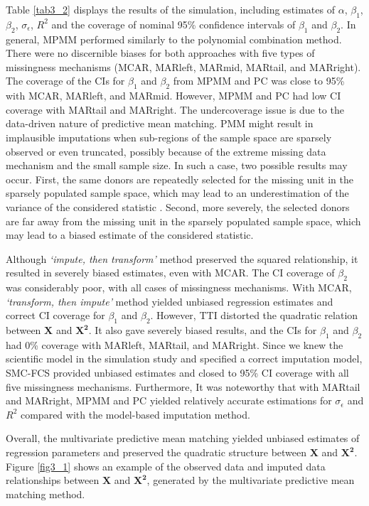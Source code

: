 	
	Table \ref{tab3_2} displays the results of the simulation, including estimates of $\alpha$, $\beta_1$, $\beta_2$, $\sigma_\epsilon$, $R^2$ and the coverage of nominal 95\% confidence intervals of $\beta_1$ and $\beta_2$. In general, MPMM performed similarly to the polynomial combination method. There were no discernible biases for both approaches with five types of missingness mechanisms (MCAR, MARleft, MARmid, MARtail, and MARright). The coverage of the CIs for $\beta_1$ and $\beta_2$ from MPMM and PC was close to 95\% with MCAR, MARleft, and MARmid. However, MPMM and PC had low CI coverage with MARtail and MARright. The undercoverage issue is due to the data-driven nature of predictive mean matching. PMM might result in implausible imputations when sub-regions of the sample space are sparsely observed or even truncated, possibly because of the extreme missing data mechanism and the small sample size. In such a case, two possible results may occur. First, the same donors are repeatedly selected for the missing unit in the sparsely populated sample space, which may lead to an underestimation of the variance of the considered statistic \citep{Jong2014}. Second, more severely, the selected donors are far away from the missing unit in the sparsely populated sample space, which may lead to a biased estimate of the considered statistic. 
	
	Although \emph{`impute, then transform'} method preserved the squared relationship, it resulted in severely biased estimates, even with MCAR. The CI coverage of $\beta_2$ was considerably poor, with all cases of missingness mechanisms. With MCAR, \emph{`transform, then impute'} method yielded unbiased regression estimates and correct CI coverage for $\beta_1$ and $\beta_2$. However, TTI distorted the quadratic relation between $\boldsymbol{X}$ and $\boldsymbol{X^2}$. It also gave severely biased results, and the CIs for $\beta_1$ and $\beta_2$ had 0\% coverage with MARleft, MARtail, and MARright. Since we knew the scientific model in the simulation study and specified a correct imputation model, SMC-FCS provided unbiased estimates and closed to 95\% CI coverage with all five missingness mechanisms. Furthermore, It was noteworthy that with MARtail and MARright, MPMM and PC yielded relatively accurate estimations for $\sigma_\epsilon$ and $R^2$ compared with the model-based imputation method.    
	
	
	Overall, the multivariate predictive mean matching yielded unbiased estimates of regression parameters and preserved the quadratic structure between $\boldsymbol{X}$ and $\boldsymbol{X^2}$. Figure \ref{fig3_1} shows an example of the observed data and imputed data relationships between $\boldsymbol{X}$ and $\boldsymbol{X^2}$, generated by the multivariate predictive mean matching method.
	
